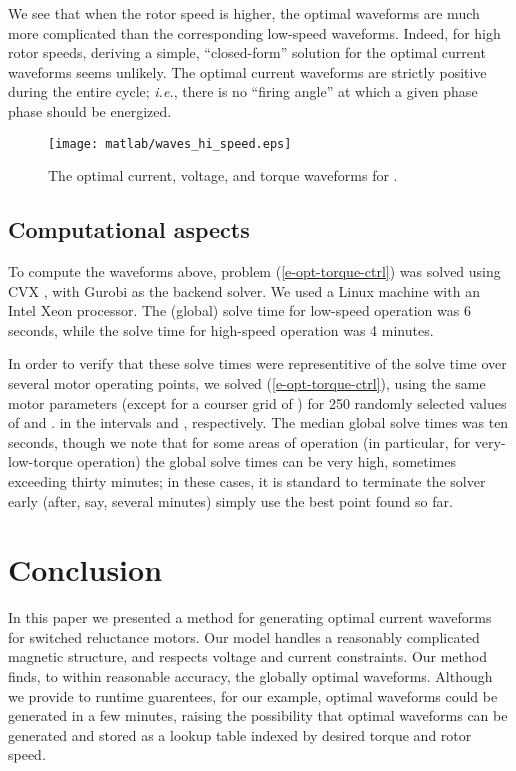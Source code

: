 \documentclass[11pt]{article}
\newcommand{\ie}{{\it i.e.}}
\newif\ifarxiv
\begin{document}
We see that when the rotor speed is higher, 
the optimal waveforms are much more complicated
than the corresponding low-speed waveforms.
Indeed, for high rotor speeds,
deriving a simple, ``closed-form'' solution
for the optimal current waveforms seems unlikely.
The optimal current waveforms are strictly positive
during the entire cycle;
\ie, there is no ``firing angle''
at which a given phase phase should be energized.

\begin{figure} 
\begin{center}
\ifarxiv
\texttt{[image: waves\_hi\_speed.eps]}
\else
\texttt{[image: matlab/waves\_hi\_speed.eps]}
\fi
\caption{
The optimal current, voltage, and torque waveforms for
 .
}
\label{f-waves-hi-speed}
\end{center}
\end{figure}


\subsection{Computational aspects}
To compute the waveforms above,
problem (\ref{e-opt-torque-ctrl}) was solved 
using CVX \cite{cvx, gb08},
with Gurobi as the backend solver.
We used a Linux machine with an Intel Xeon processor.
The (global) solve time for low-speed operation was 6 seconds,
while the solve time for high-speed operation was 4 minutes.


In order to verify that these solve times were representitive
of the solve time over several motor operating points,
we solved (\ref{e-opt-torque-ctrl}), 
using the same motor parameters 
(except for a courser grid of )
for 250 randomly selected values of  and .
in the intervals   and  , respectively.
The median global solve times was ten seconds,
though we note that for some areas of operation
(in particular, for very-low-torque operation)
the global solve times can be very high, sometimes exceeding thirty minutes;
in these cases, it is standard to terminate the solver early
(after, say, several minutes)
simply use the best point found so far.










\section{Conclusion}
In this paper we presented a method for generating optimal current waveforms
for switched reluctance motors.
Our model handles a reasonably complicated magnetic structure,
and respects voltage and current constraints.
Our method finds, to within reasonable accuracy,
the globally optimal waveforms.
Although we provide to runtime guarentees,
for our example, optimal waveforms could be generated in a few minutes,
raising the possibility that optimal waveforms can be generated
and stored as a lookup table indexed by desired torque and rotor speed.


\newpage

\end{document}
